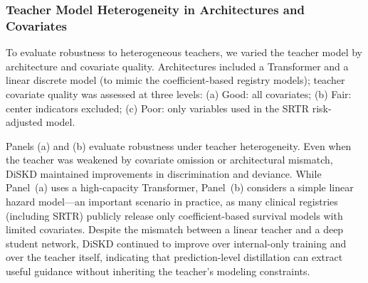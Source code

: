 \documentclass{article}
\theoremstyle{plain}
\theoremstyle{definition}
\theoremstyle{remark}
\begin{document}
\subsubsection{Teacher Model Heterogeneity in Architectures and Covariates}
\label{A.SRTR1.TeacherHetero}
To evaluate robustness to heterogeneous teachers, we varied the teacher model by architecture and covariate quality. Architectures included a Transformer and a linear discrete model (to mimic the coefficient-based registry models); teacher covariate quality was assessed at three levels:
(a) Good: all covariates;
(b) Fair: center indicators excluded;
(c) Poor: only variables used in the SRTR risk-adjusted model.


Panels (a) and (b) evaluate robustness under teacher heterogeneity.
Even when the teacher was weakened by covariate omission or architectural mismatch, DiSKD maintained improvements in discrimination and deviance.
While Panel~(a) uses a high-capacity Transformer, Panel~(b) considers a simple linear hazard model—an important scenario in practice, as many clinical registries (including SRTR) publicly release only coefficient-based survival models with limited covariates.  
Despite the mismatch between a linear teacher and a deep student network, DiSKD continued to improve over internal-only training and over the teacher itself, indicating that prediction-level distillation can extract useful guidance without inheriting the teacher's modeling constraints.
\end{document}
